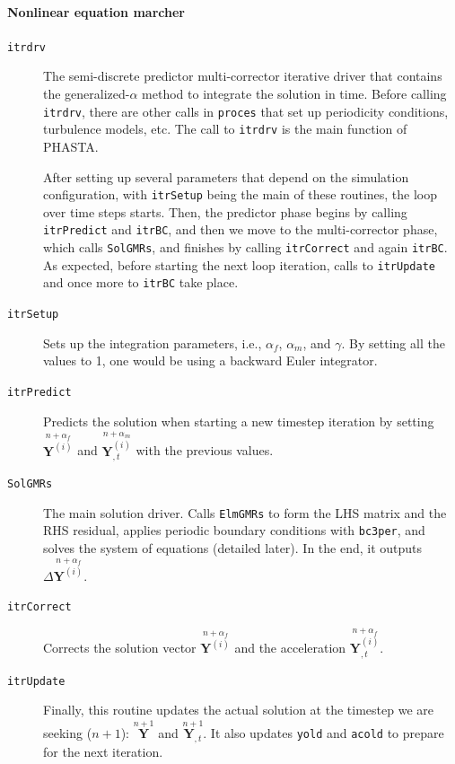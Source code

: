 \documentclass{ucb}
\begin{document}
\paragraph{Nonlinear equation marcher}

\begin{description}

    \item[\texttt{itrdrv}] The semi-discrete predictor multi-corrector iterative driver that contains the generalized-$\alpha$ method to integrate the solution in time. Before calling \texttt{itrdrv}, there are other calls in \texttt{proces} that set up periodicity conditions, turbulence models, etc. The call to \texttt{itrdrv} is the main function of PHASTA.
    
    After setting up several parameters that depend on the simulation configuration, with \texttt{itrSetup} being the main of these routines, the loop over time steps starts. Then, the predictor phase begins by calling \texttt{itrPredict} and \texttt{itrBC}, and then we move to the multi-corrector phase, which calls \texttt{SolGMRs}, and finishes by calling \texttt{itrCorrect} and again \texttt{itrBC}. As expected, before starting the next loop iteration, calls to \texttt{itrUpdate} and once more to \texttt{itrBC} take place.
    
    
    \item[\texttt{itrSetup}] Sets up the integration parameters, i.e., $\alpha_f$, $\alpha_m$, and $\gamma$. By setting all the values to 1, one would be using a backward Euler integrator.
    
    \item[\texttt{itrPredict}] Predicts the solution when starting a new timestep iteration by setting $\overset{n+\alpha_f}{\bm{Y}^{(i)}}$ and $\overset{n+\alpha_m}{\bm{Y}^{(i)}_{,t}}$ with the previous values.
    
    \item[\texttt{SolGMRs}] The main solution driver. Calls \texttt{ElmGMRs} to form the LHS matrix and the RHS residual, applies periodic boundary conditions with \texttt{bc3per}, and solves the system of equations (detailed later). In the end, it outputs $\Delta\overset{n+\alpha_f}{\bm{Y}^{(i)}}$.
    
    \item[\texttt{itrCorrect}] Corrects the solution vector $\overset{n+\alpha_f}{\bm{Y}^{(i)}}$ and the acceleration $\overset{n+\alpha_f}{\bm{Y}^{(i)}_{,t}}$.
    
    \item[\texttt{itrUpdate}] Finally, this routine updates the actual solution at the timestep we are seeking ($n + 1$): $\overset{n+1}{\bm{Y}}$ and $\overset{n+1}{\bm{Y}_{,t}}$. It also updates \texttt{yold} and \texttt{acold} to prepare for the next iteration.

\end{description}
\end{document}
